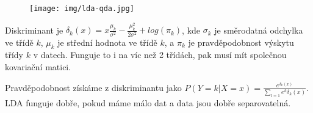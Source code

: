 \documentclass[10pt,a4paper]{article}
\begin{document}
\begin{figure}[ht!]
\centering
\texttt{[image: img/lda-qda.jpg]}
\end{figure}

Diskriminant je $\delta_k(x) = x\frac{\mu_k}{\sigma^2} - \frac{\mu_k^2}{2\sigma^2} + log(\pi_k)$, kde $\sigma_k$ je směrodatná odchylka ve třídě $k$, $\mu_k$ je střední hodnota ve třídě $k$, a $\pi_k$ je pravděpodobnost výskytu třídy $k$ v datech. Funguje to i na víc než 2 třídách, pak musí mít společnou kovariační matici.

Pravděpodobnost získáme z diskriminantu jako $P(Y=k|X=x) = \frac{e^{\delta_k(x)}}{\sum_{l=1}e^k{\delta_k(x)}}$. LDA funguje dobře, pokud máme málo dat a data jsou dobře separovatelná.
\end{document}
